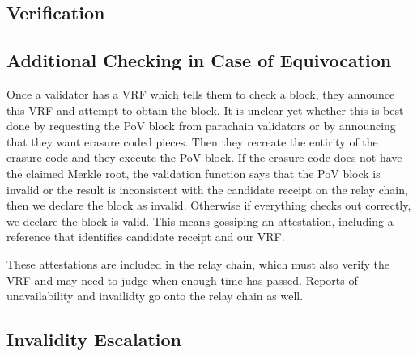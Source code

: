 \subsection{Verification}


\subsection{Additional Checking in Case of Equivocation}\label{sect-equivocation-case}

Once a validator has a VRF which tells them to check a block, they announce this VRF and attempt to obtain the block. 
It is unclear yet whether this is best done by requesting the PoV block from parachain validators or by announcing that they want erasure coded pieces. 
Then they recreate the entirity of the erasure code and they execute the PoV block. 
If the erasure code does not have the claimed Merkle root, the validation function says that the PoV block is invalid or the result is inconsistent with the candidate receipt on the relay chain, then we declare the block as invalid. 
Otherwise if everything checks out correctly, we declare the block is valid. This means gossiping an attestation, including a reference that identifies candidate receipt and our VRF. 

These attestations are included in the relay chain, which must also verify the VRF and may need to judge when enough time has passed. Reports of unavailability and invailidty go onto the relay chain as well.

\subsection{Invalidity Escalation}\label{escalation}

